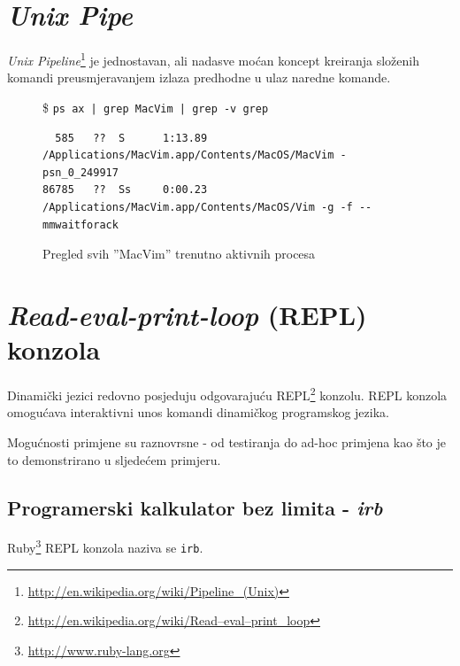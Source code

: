 \documentclass[times, utf8, seminar]{fit}
\begin{document}
%
%
%
%
%

\section{\emph{Unix Pipe}}

\emph{Unix Pipeline}\footnote{\url{http://en.wikipedia.org/wiki/Pipeline_(Unix)}} je jednostavan, ali nadasve moćan koncept kreiranja složenih komandi preusmjeravanjem izlaza predhodne u ulaz naredne komande.

\begin{figure}[H]
\$ \verb+ps ax | grep MacVim | grep -v grep+
\begin{lstlisting}
  585   ??  S      1:13.89 /Applications/MacVim.app/Contents/MacOS/MacVim -psn_0_249917
86785   ??  Ss     0:00.23 /Applications/MacVim.app/Contents/MacOS/Vim -g -f --mmwaitforack
\end{lstlisting}

\caption{Pregled svih ''MacVim'' trenutno aktivnih procesa}
\end{figure}


\section{\emph{Read-eval-print-loop} (REPL) konzola}

Dinamički jezici redovno posjeduju odgovarajuću REPL\footnote{\url{http://en.wikipedia.org/wiki/Read–eval–print_loop}} konzolu.
REPL konzola omogućava interaktivni unos komandi dinamičkog programskog jezika.

Mogućnosti primjene su raznovrsne - od testiranja do ad-hoc primjena kao što je to demonstrirano u sljedećem primjeru.

\subsection{Programerski kalkulator bez limita - \emph{irb}}

Ruby\footnote{\url{http://www.ruby-lang.org}} REPL konzola naziva se \verb+irb+. 
\end{document}
